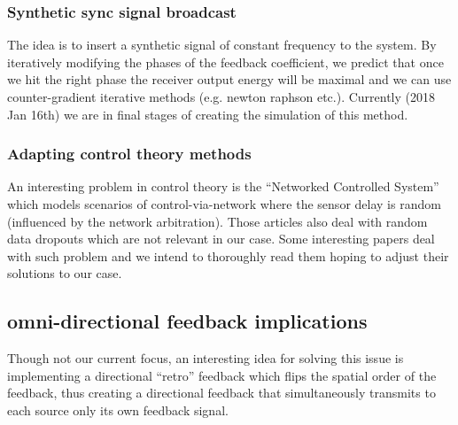 \documentclass[12pt]{article}
\begin{document}
\subsubsection*{Synthetic sync signal broadcast}

The idea is to insert a synthetic signal of constant frequency to the system. By iteratively modifying the phases of the feedback coefficient, we predict that once we hit the right phase the receiver output energy will be maximal and we can use counter-gradient iterative methods (e.g. newton raphson etc.). Currently (2018 Jan 16th) we are in final stages of creating the simulation of this method.

\subsubsection*{Adapting control theory methods}

An interesting problem in control theory is the ``Networked Controlled System'' which models scenarios of control-via-network where the sensor delay is random (influenced by the network arbitration). Those articles also deal with random data dropouts which are not relevant in our case. Some interesting papers \cite{Luan2011StabilizationDelays,Lewis1998ControlDelays} deal with such problem and we intend to thoroughly read them hoping to adjust their solutions to our case.

\subsection*{omni-directional feedback implications}

Though not our current focus, an interesting idea for solving this issue is implementing a directional ``retro'' feedback which flips the spatial order of the feedback, thus creating a directional feedback that simultaneously transmits to each source only its own feedback signal. 

\clearpage
\small
{


}
\end{document}
